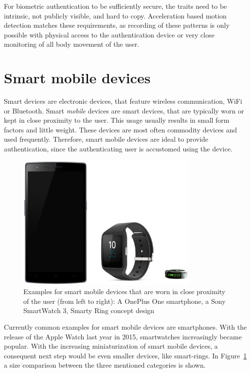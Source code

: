 For biometric authentication to be sufficiently secure, the traits need to be intrinsic, \ie not publicly visible, and hard to copy. Acceleration based motion detection matches these requirements, as recording of these patterns is only possible with physical access to the authentication device or very close monitoring of all body movement of the user.

\section{Smart mobile devices}
Smart devices are electronic devices, that feature wireless communication, \eg WiFi or Bluetooth. Smart \emph{mobile} devices are smart devices, that are typically worn or kept in close proximity to the user. This usage usually results in small form factors and little weight. These devices are most often commodity devices and used frequently. Therefore, smart mobile devices are ideal to provide authentication, since the authenticating user is accustomed using the device.

\begin{figure}
    \centering
    \includegraphics[width=0.8\textwidth]{figures/SmartDevices.png}
    \caption{Examples for smart mobile devices that are worn in close proximity of the user (from left to right): A OnePlus One smartphone, a Sony SmartWatch 3, Smarty Ring concept design}
    \label{fig:smartdevices}
\end{figure}
Currently common examples for smart mobile devices are smartphones. With the release of the Apple Watch last year in 2015, smartwatches increasingly became popular. With the increasing miniaturization of smart mobile devices, a consequent next step would be even smaller devices, like smart-rings. In Figure~\ref{fig:smartdevices} a size comparison between the three mentioned categories is shown.

